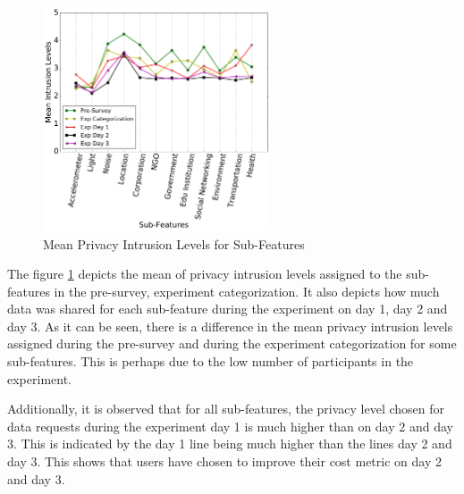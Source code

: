 \begin{figure}[ht!]
\centering
\includegraphics[width=0.6\textwidth,keepaspectratio]{./images/all_sub_mean}
\caption{Mean Privacy Intrusion Levels for Sub-Features}
\label{fig:sum_mean}
\end{figure}

The figure \ref{fig:sum_mean} depicts the mean of privacy intrusion levels assigned to the sub-features in the pre-survey, experiment categorization. It also depicts how much data was shared for each sub-feature during the experiment on day 1, day 2 and day 3. As it can be seen, there is a difference in the mean privacy intrusion levels assigned during the pre-survey and during the experiment categorization for some sub-features. This is perhaps due to the low number of participants in the experiment.

Additionally, it is observed that for all sub-features, the privacy level chosen for data requests during the experiment day 1 is much higher than on day 2 and day 3. This is indicated by the day 1 line being much higher than the lines day 2 and day 3. This shows that users have chosen to improve their cost metric on day 2 and day 3.

